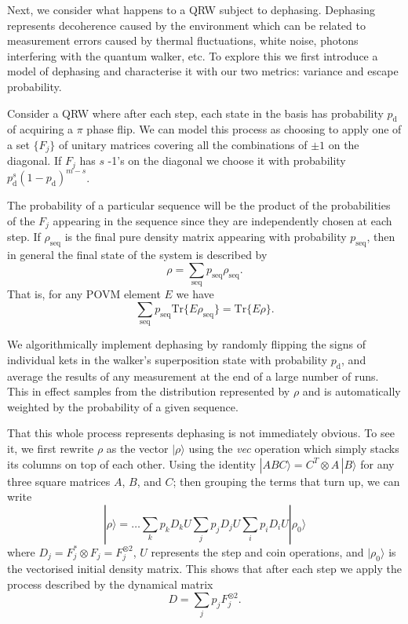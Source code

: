 \documentclass[aps,pra,twocolumn,amsmath,amssymb,nofootinbib,superscriptaddress]{revtex4}
\newcommand{\ket}[1]{|#1\rangle}
\begin{document}
Next, we consider what happens to a QRW subject to dephasing. Dephasing represents decoherence caused by the environment which can be related to measurement errors caused by thermal fluctuations, white noise, photons interfering with the quantum walker, etc. To explore this we first introduce a model of dephasing and characterise it with our two metrics: variance and escape probability. 

Consider a QRW where after each step, each state in the basis has probability $p_{\mathrm{d}}$ of acquiring a $\pi$ phase flip. We can model this process as choosing to apply one of a set $\{F_j\}$ of unitary matrices covering all the combinations of $\pm 1$ on the diagonal. If $F_j$ has $s$ -1's on the diagonal we choose it with probability $p_{\mathrm{d}}^s(1-p_{\mathrm{d}})^{m-s}$. 

The probability of a particular sequence will be the product of the probabilities of the $F_j$ appearing in the sequence since they are independently chosen at each step. If $\rho_\mathrm{seq}$ is the final pure density matrix appearing with probability $p_\mathrm{seq}$, then in general the final state of the system is described by
\begin{equation}
    \rho = \sum_\mathrm{seq} p_\mathrm{seq} \rho_\mathrm{seq}.
\end{equation}
That is, for any POVM element $E$ we have 
\begin{equation}
    \sum_\mathrm{seq} p_\mathrm{seq} \mathrm{Tr}\{E \rho_\mathrm{seq}\} = \mathrm{Tr}\{E \rho\}.
\end{equation}

We algorithmically implement dephasing by randomly flipping the signs of individual kets in the walker's superposition state with probability $p_{\mathrm{d}}$, and average the results of any measurement at the end of a large number of runs. This in effect samples from the  distribution represented by $\rho$ and is automatically weighted by the probability of a given sequence. 

That this whole process represents dephasing is not immediately obvious. To see it, we first rewrite $\rho$ as the vector $\ket{\rho}$ using the \emph{vec} operation which simply stacks its columns on top of each other. Using the identity $\ket{ABC}=C^T\!\!\otimes\!A\,\ket{B}$ for any three square matrices $A$, $B$, and $C$; then grouping the terms that turn up, we can write 
\begin{equation} \label{eq:vecrho}
    \ket{\rho} = \ldots \sum_k p_k D_k U\sum_j p_j D_j U\sum_i p_i D_i U\ket{\rho_0}
\end{equation}
where $D_j = F_j^*\!\otimes\!F_j=F_j^{\otimes 2}$, $U$ represents the step and coin operations, and $\ket{\rho_0}$ is the vectorised initial density matrix. This shows that after each step we apply the process described by the dynamical matrix
\begin{equation}
    D = \sum_j p_j F_j^{\otimes 2}.
\end{equation}
\end{document}
